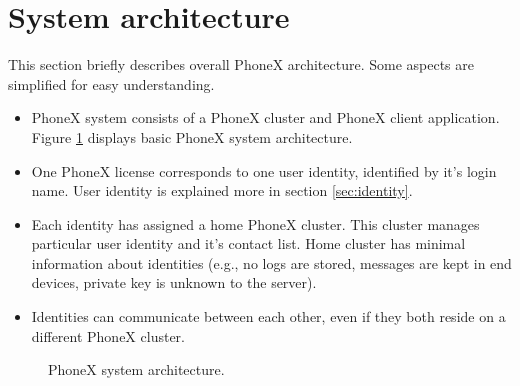 \documentclass[a4paper,10pt]{article}
\begin{document}
\section{System architecture}
This section briefly describes overall PhoneX architecture. Some aspects are simplified for easy understanding.
\begin{itemize}
 \item PhoneX system consists of a PhoneX cluster and PhoneX client application. Figure \ref{fig:diag_architecture} displays basic PhoneX system architecture.
 \item One PhoneX license corresponds to one user identity, identified by it's login name. User identity is explained more in section \ref{sec:identity}. 
 \item Each identity has assigned a home PhoneX cluster. This cluster manages particular user identity and it's contact list. Home cluster has minimal
information about identities (e.g., no logs are stored, messages are kept in end devices, private key is unknown to the server).
 \item Identities can communicate between each other, even if they both reside on a different PhoneX cluster. 
\end{itemize}

\begin{center}
\begin{figure}[h!]
\centering
{}
\caption{PhoneX system architecture.}
\label{fig:diag_architecture}
\end{figure}
\end{center}
\end{document}
